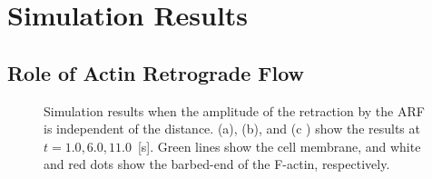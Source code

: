 \documentclass[a4paper,12pt, oneside]{book}
\begin{document}
\section{Simulation Results}
\subsection{Role of Actin Retrograde Flow}
\begin{figure}[tbp]
 \caption{ Simulation results when the amplitude of the retraction by the ARF is independent of the distance. (a), (b), and (c ) show the results at $t = 1.0, 6.0, 11.0$~[s]. Green lines show the cell membrane, and white and red dots show the barbed-end of the F-actin, respectively.}
 \label{fig:res0}
\end{figure}
\end{document}
